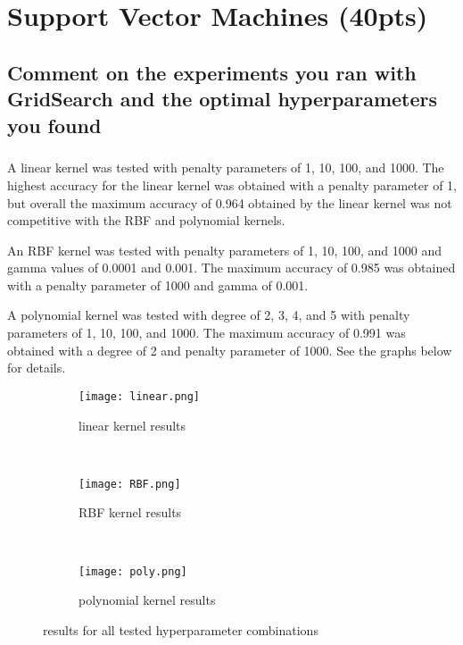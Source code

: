 \documentclass[11pt]{article}
\begin{document}
\thispagestyle{empty}

\newlength{\boxlength}\setlength{\boxlength}{\textwidth}
\addtolength{\boxlength}{-4mm}

\begin{center}
\end{center}




\section{Support Vector Machines (40pts)}

\subsection{Comment on the experiments you ran with GridSearch and the optimal hyperparameters you found}

\subparagraph{}

A linear kernel was tested with penalty parameters of 1, 10, 100, and 1000. The highest accuracy for the linear kernel was obtained with a penalty parameter of 1, but overall the maximum accuracy of 0.964 obtained by the linear kernel was not competitive with the RBF and polynomial kernels.

An RBF kernel was tested with penalty parameters of 1, 10, 100, and 1000 and gamma values of 0.0001 and 0.001. The maximum accuracy of 0.985 was obtained with a penalty parameter of 1000 and gamma of 0.001. 

A polynomial kernel was tested with degree of 2, 3, 4, and 5 with penalty parameters of 1, 10, 100, and 1000. The maximum accuracy of 0.991 was obtained with a degree of 2 and penalty parameter of 1000. See the graphs below for details.

\begin{figure}[h]
	\centering
	\begin{subfigure}[b]{0.4\linewidth}
		\texttt{[image: linear.png]}
		\caption{linear kernel results}
	\end{subfigure}
	~
	\begin{subfigure}[b]{0.4\linewidth}
		\texttt{[image: RBF.png]}
		\caption{RBF kernel results}
	\end{subfigure}
	~
	\begin{subfigure}[b]{0.4\linewidth}
		\texttt{[image: poly.png]}
		\caption{polynomial kernel results}
	\end{subfigure}
	\caption{results for all tested hyperparameter combinations}
\end{figure}
\end{document}
